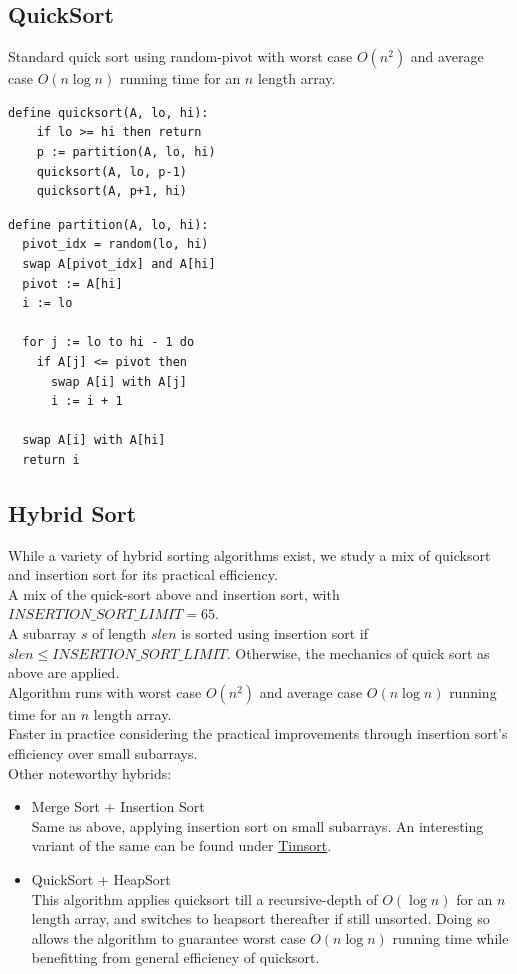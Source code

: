 \documentclass[12pt]{article}
\begin{document}
\subsection{QuickSort\cite{quicksort_wiki}}
Standard quick sort using random-pivot with worst case $O(n^2)$ and average case $O(n\log n)$ running time for an $n$ length array.
\begin{verbatim}
define quicksort(A, lo, hi):
    if lo >= hi then return
    p := partition(A, lo, hi)
    quicksort(A, lo, p-1)
    quicksort(A, p+1, hi)
\end{verbatim}
\begin{verbatim}
define partition(A, lo, hi):
  pivot_idx = random(lo, hi)
  swap A[pivot_idx] and A[hi]
  pivot := A[hi]
  i := lo

  for j := lo to hi - 1 do 
    if A[j] <= pivot then 
      swap A[i] with A[j]
      i := i + 1

  swap A[i] with A[hi]
  return i
\end{verbatim}

\subsection{Hybrid Sort}
While a variety of hybrid sorting algorithms exist, we study a mix of quicksort and insertion sort for its practical efficiency.  \\
A mix of the quick-sort above and insertion sort, with $INSERTION\_SORT\_LIMIT = 65$.\cite{dual_pivot_quicksort_jdk}  \\
A subarray $s$ of length $slen$ is sorted using insertion sort if $slen \leq INSERTION\_SORT\_LIMIT$. Otherwise, the mechanics of quick sort as above are applied. \\
Algorithm runs with worst case $O(n^2)$ and average case $O(n\log n)$ running time for an $n$ length array. \\
Faster in practice considering the practical improvements through insertion sort's efficiency over small subarrays.  \\
Other noteworthy hybrids:
\begin{itemize}
  \item {Merge Sort + Insertion Sort} \\
  Same as above, applying insertion sort on small subarrays.  
  An interesting variant of the same can be found under \hyperref[https://en.wikipedia.org/wiki/Timsort]{Timsort}. 
  \item {QuickSort + HeapSort} \\
  This algorithm applies quicksort till a recursive-depth of $O(\log n)$ for an $n$ length array, and switches to heapsort thereafter if still unsorted.  
  Doing so allows the algorithm to guarantee worst case $O(n\log n)$ running time while benefitting from general efficiency of quicksort.
\end{itemize}
\end{document}

